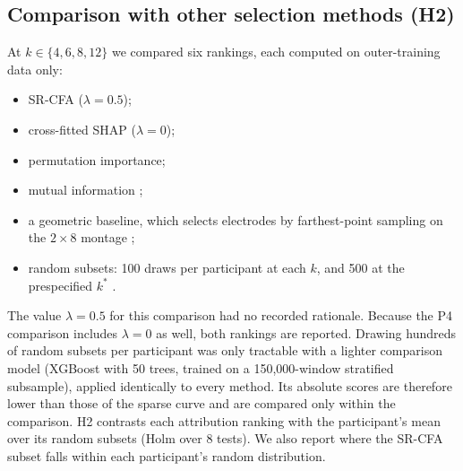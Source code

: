 \subsection{Comparison with other selection methods (H2)}
At $k \in \{4, 6, 8, 12\}$ we compared six rankings, each computed on outer-training data only:
\begin{itemize}
\item SR-CFA ($\lambda = 0.5$);
\item cross-fitted SHAP ($\lambda = 0$);
\item permutation importance;
\item mutual information ;
\item a geometric baseline, which selects electrodes by farthest-point sampling on the $2 \times 8$ montage ;
\item random subsets: 100 draws per participant at each $k$, and 500 at the prespecified $k^*$ .
\end{itemize}
The value $\lambda = 0.5$ for this comparison had no recorded rationale. Because the P4 comparison includes $\lambda = 0$ as well, both rankings are reported. Drawing hundreds of random subsets per participant was only tractable with a lighter comparison model (XGBoost with 50 trees, trained on a 150,000-window stratified subsample), applied identically to every method. Its absolute scores are therefore lower than those of the sparse curve and are compared only within the comparison. H2 contrasts each attribution ranking with the participant's mean over its random subsets (Holm over 8 tests). We also report where the SR-CFA subset falls within each participant's random distribution. 

